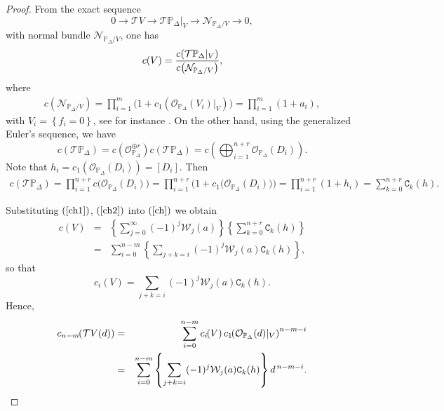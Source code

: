 \documentclass[11pt]{amsart}
\theoremstyle{plain}
\theoremstyle{definition}
\begin{document}
\begin{proof}
From the exact sequence
$$0\rightarrow \mathcal{T}V \rightarrow \mathcal{T}\mathbb{P}_{\Delta}|_V\rightarrow \mathcal{N}_{\mathbb{P}_{\Delta}/V}\rightarrow 0,$$
with normal bundle $\mathcal{N}_{\mathbb{P}_{\Delta}/V}$, one has 
\begin{eqnarray} \label{ch}
c(V)=\frac{c\hspace{-0,5mm}\left(\mathcal{T}\mathbb{P}_{\Delta}|_V\right)}
{c\hspace{-0,5mm}\left(\mathcal{N}_{\mathbb{P}_{\Delta}/V}\right)},
\end{eqnarray}
where 
\begin{eqnarray} \label{ch1}
c\left(\mathcal{N}_{\mathbb{P}_{\Delta}/V}\right)=\prod_{i=1}^m
\big(1+c_1\left(\mathcal{O}_{\mathbb{P}_{\Delta}}(V_i)|_V\right)\big)=\prod_{i=1}^m(1+a_i),
\end{eqnarray} 
with $V_i=\left\{f_i=0\right\}$, see for instance \cite[p.59]{Fu}. On the other hand, using the generalized Euler's sequence, we have 
$$c\left(\mathcal{T}\mathbb{P}_{\Delta}\right)
=c\left(\mathcal{O}^{\oplus r}_{\mathbb{P}_{\Delta}}\right)c\left(\mathcal{T}\mathbb{P}_{\Delta}\right)
=c\left(\bigoplus_{i=1}^{n+r} \mathcal{O}_{\mathbb{P}_{\Delta}}(D_i)\right).$$
Note that $h_i=c_{1}(\mathcal{O}_{\mathbb{P}_{\Delta}}(D_i))=\left[D_i\right]$. Then
\begin{eqnarray} \label{ch2}
c\left(\mathcal{T}\mathbb{P}_{\Delta}\right)=
\prod_{i=1}^{n+r}c\big(\mathcal{O}_{\mathbb{P}_{\Delta}}(D_i)\big)=
\prod_{i=1}^{n+r}\Big(1+c_1\big(\mathcal{O}_{\mathbb{P}_{\Delta}}(D_i)\big)\Big)
=\prod_{i=1}^{n+r}(1+h_{i})=\sum_{k=0}^{n+r}\texttt{C}_{k}(h).
\end{eqnarray}

Substituting $(\ref{ch1})$, $(\ref{ch2})$ into $(\ref{ch})$ we obtain
\begin{eqnarray*}
c(V)&=&\left\{\sum_{j=0}^{\infty}(-1)^{j}\mathcal{W}_j(a)\right\}
\left\{\sum_{k=0}^{n+r}\texttt{C}_{k}(h)\right\} \\
&=& \sum_{i=0}^{n-m}\left\{\sum_{j+k=i}(-1)^{j}\mathcal{W}_j(a)\texttt{C}_{k}(h)\right\},
\end{eqnarray*}
so that
$$c_i(V)=\sum_{j+k=i}(-1)^{j}\mathcal{W}_j(a)\texttt{C}_{k}(h).$$
Hence,
\begin{eqnarray*}
c_{n-m}\hspace{-1mm}\left(\mathcal{T}V(d)\right)
&=&\sum_{i=0}^{n-m}c_i\hspace{-1mm}\left(V\right)
c_1\hspace{-1mm}\left(\mathcal{O}_{\mathbb{P}_{\Delta}}(d)|_V\right)^{n-m-i} \\
&=&\sum_{i=0}^{n-m}\left\{\sum_{j+k=i}(-1)^{j}\mathcal{W}_j(a)\texttt{C}_{k}(h)\right\}d^{\,n-m-i}.
\end{eqnarray*}


\end{proof}
\end{document}
